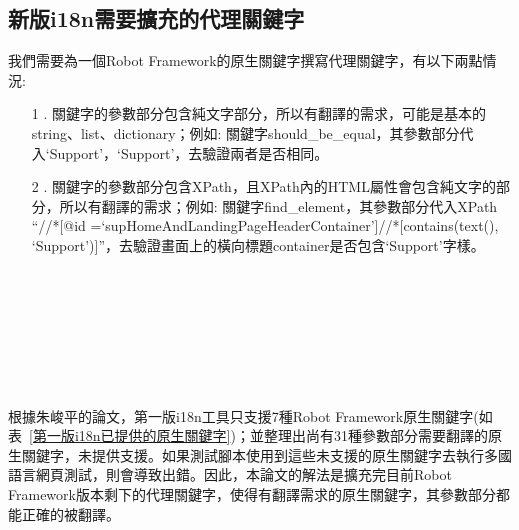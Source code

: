 \subsection{新版i18n需要擴充的代理關鍵字}

我們需要為一個Robot Framework的原生關鍵字撰寫代理關鍵字，有以下兩點情況:

\begin{itemize}
\item[1 .]關鍵字的參數部分包含純文字部分，所以有翻譯的需求，可能是基本的string、list、dictionary；例如: 關鍵字should\_be\_equal，其參數部分代入‘Support’，‘Support’，去驗證兩者是否相同。

\item[2 .]關鍵字的參數部分包含XPath，且XPath內的HTML屬性會包含純文字的部分，所以有翻譯的需求；例如: 關鍵字find\_element，其參數部分代入XPath “//*[@id =‘supHomeAndLandingPageHeaderContainer’]//*[contains(text(), ‘Support’)]”，去驗證畫面上的橫向標題container是否包含‘Support’字樣。
\end{itemize}

\hspace*{\fill} \\
\\ \hspace*{\fill} \\
\\ \hspace*{\fill} \\
\\ \hspace*{\fill} \\

根據朱峻平的論文\cite{i18n}，第一版i18n工具只支援7種Robot Framework原生關鍵字(如表~\ref{第一版i18n已提供的原生關鍵字})；並整理出尚有31種參數部分需要翻譯的原生關鍵字，未提供支援。如果測試腳本使用到這些未支援的原生關鍵字去執行多國語言網頁測試，則會導致出錯。因此，本論文的解法是擴充完目前Robot Framework版本剩下的代理關鍵字，使得有翻譯需求的原生關鍵字，其參數部分都能正確的被翻譯。

\renewcommand\arraystretch{0.8}
\begin{table}[H]
    \centering
    \caption{第一版i18n已提供代理的Robot Framework原生關鍵字}
    \hspace*{\fill} \\
    \label{第一版i18n已提供的原生關鍵字}
\end{table}

